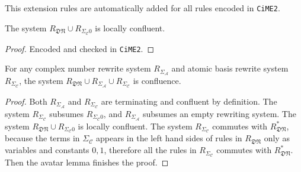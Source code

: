 \documentclass[manuscript, review, timestamp]{acmart}
\begin{document}
This extension rules are automatically added for all rules encoded in \texttt{CiME2}.

\begin{proposition}
  The system $R_\mathfrak{DN} \cup R_{\Sigma_\mathcal{C}0}$ is locally confluent.
\end{proposition}
\begin{proof}
  Encoded and checked in \texttt{CiME2}.
\end{proof}


\begin{lemma}
  For any complex number rewrite system $R_{\Sigma_\mathcal{A}}$ and atomic basis rewrite system $R_{\Sigma_\mathcal{C}}$, the system $R_\mathfrak{DN} \cup R_{\Sigma_\mathcal{A}} \cup R_{\Sigma_\mathcal{C}}$ is confluence.
\end{lemma}
\begin{proof}
  Both $R_{\Sigma_\mathcal{A}}$ and $R_{\Sigma_\mathcal{C}}$ are terminating and confluent by definition. 
  The system $R_{\Sigma_\mathcal{C}}$ subsumes $R_{\Sigma_\mathcal{C}0}$, and $R_{\Sigma_\mathcal{A}}$ subsumes an empty rewriting system. 
  The system $R_\mathfrak{DN} \cup R_{\Sigma_\mathcal{C}0}$ is locally confluent. 
  The system $R_{\Sigma_\mathcal{C}}$ commutes with $R_\mathfrak{DN}^*$, because the terms in $\Sigma_\mathcal{C}$ appears in the left hand sides of rules in $R_\mathfrak{DN}$ only as variables and constants $0, 1$, therefore all the rules in $R_{\Sigma_\mathcal{C}}$ commutes with $R_\mathfrak{DN}^*$. 
  Then the avatar lemma finishes the proof.
\end{proof}





\end{document}
